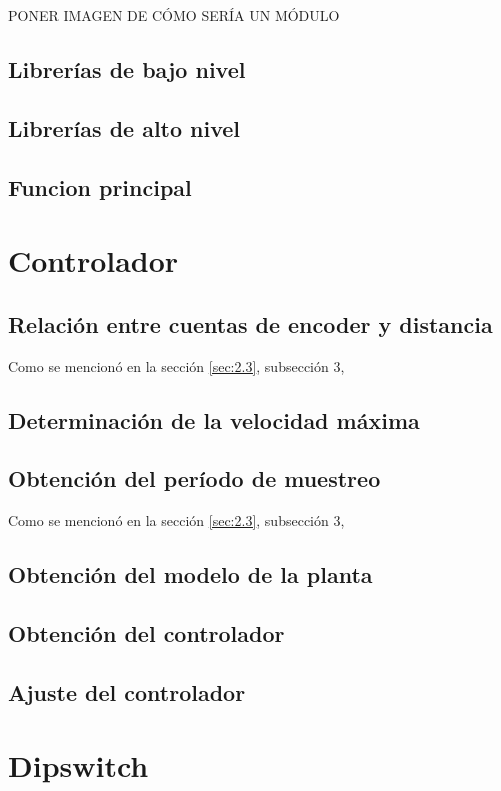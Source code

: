 \textcolor{FIXME}{PONER IMAGEN DE CÓMO SERÍA UN MÓDULO}

\subsection{Librerías de bajo nivel}

\subsection{Librerías de alto nivel}

\subsection{Funcion principal}

\section{Controlador} \label{sec:\thesection}

\subsection{Relación entre cuentas de encoder y distancia}
Como se mencionó en la sección \ref{sec:2.3}, subsección 3, 

\subsection{Determinación de la velocidad máxima}

\subsection{Obtención del período de muestreo}
Como se mencionó en la sección \ref{sec:2.3}, subsección 3, 

\subsection{Obtención del modelo de la planta}

\subsection{Obtención del controlador}

\subsection{Ajuste del controlador}


\section{Dipswitch} \label{sec:\thesection}


